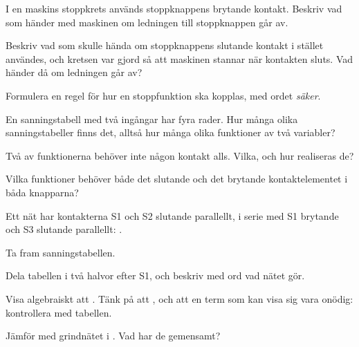 \label{c3:ex:6}
\begin{parts}
  \item I en maskins stoppkrets används stoppknappens brytande kontakt. Beskriv vad som händer med
    maskinen om ledningen till stoppknappen går av.
  \item Beskriv vad som skulle hända om stoppknappens slutande kontakt i stället användes, och
    kretsen var gjord så att maskinen stannar när kontakten sluts. Vad händer då om ledningen går
    av?
  \item Formulera en regel för hur en stoppfunktion ska kopplas, med ordet \emph{säker}.
\end{parts}

\label{c3:ex:7}
\begin{parts}
  \item En sanningstabell med två ingångar har fyra rader. Hur många olika sanningstabeller finns
    det, alltså hur många olika funktioner av två variabler?
  \item Två av funktionerna behöver inte någon kontakt alls. Vilka, och hur realiseras de?
  \item Vilka funktioner behöver både det slutande och det brytande kontaktelementet i båda
    knapparna?
\end{parts}

\label{c3:ex:8}
Ett nät har kontakterna S1 och S2 slutande parallellt, i serie med S1 brytande och S3 slutande
parallellt: .
\begin{parts}
  \item Ta fram sanningstabellen.
  \item Dela tabellen i två halvor efter S1, och beskriv med ord vad nätet gör.
  \item Visa algebraiskt att . Tänk på att
    , och att en term som  kan visa sig vara onödig: kontrollera
    med tabellen.
  \item Jämför med grindnätet i . Vad har de gemensamt?
\end{parts}
